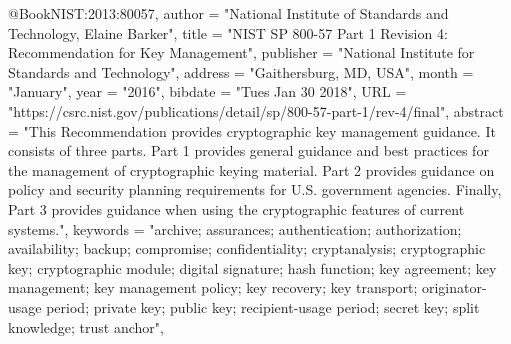 @Book{NIST:2013:80057,
  author =       "{National Institute of Standards and Technology}, {Elaine Barker}",
  title =        "{NIST SP 800-57 Part 1 Revision 4}: Recommendation for Key Management",
  publisher =    "National Institute for Standards and Technology",
  address =      "Gaithersburg, MD, USA",
  month =        "January",
  year =         "2016",
  bibdate =      "Tues Jan 30 2018",
  URL =          "https://csrc.nist.gov/publications/detail/sp/800-57-part-1/rev-4/final",
  abstract =     "This Recommendation provides cryptographic key management guidance. It consists of three parts. Part 1 provides general guidance and best practices for the management of cryptographic keying material. Part 2 provides guidance on policy and security planning requirements for U.S. government agencies. Finally, Part 3 provides guidance when using the cryptographic features of current systems.",
  keywords =     "archive; assurances; authentication; authorization; availability; backup; compromise; confidentiality; cryptanalysis; cryptographic key; cryptographic module; digital signature; hash function; key agreement; key management; key management policy; key recovery; key transport; originator-usage period; private key; public key; recipient-usage period; secret key; split knowledge; trust anchor",
}